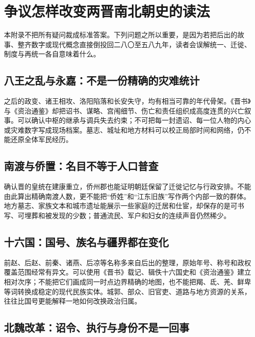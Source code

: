 \chapter{争议怎样改变两晋南北朝史的读法}
\label{app:controversies}

本附录不把所有疑问裁成标准答案。下列问题之所以重要，是因为若把后出的故事、整齐数字或现代概念直接倒投回二八〇至五八九年，读者会误解统一、迁徙、制度与再统一各自意味着什么。

\section{八王之乱与永嘉：不是一份精确的灾难统计}

之后的政变、诸王相攻、洛阳陷落和长安失守，均有相当可靠的年代骨架。《晋书》与《资治通鉴》却把诏书、谋略、宫闱细节、伤亡和责任组织成高度连贯的兴亡叙事。可以确认中枢的继承与调兵失去约束；不可把每一封遗诏、每一位人物的内心或灾难数字写成现场档案。墓志、城址和地方材料可以校正局部时间和网络，仍不能还原全体军民经历。

\section{南渡与侨置：名目不等于人口普查}

确认晋的皇统在建康重立，侨州郡也能证明朝廷保留了迁徙记忆与行政安排。不能由此算出精确南渡人数，更不能把“侨姓”和“江东旧族”写作两个内部一致的群体。地方墓志、家族文本和城市遗址能展示一些家庭的迁居和仕宦，却保存的是可书写、可埋葬和被发现的少数；普通流民、军户和妇女的连续声音仍然稀少。

\section{十六国：国号、族名与疆界都在变化}

前赵、后赵、前秦、诸燕、后凉等名称多来自后出的整理，原始年号、称号和政权覆盖范围经常有异文。可以使用《晋书》载记、辑佚十六国史和《资治通鉴》建立相对次序；不能把它们画成同一时点边界精确的地图，也不能把羯、氐、羌、鲜卑等词转换成稳定的现代民族实体。城郭、部众、旧官吏、道路与地方资源的关系，往往比国号更能解释一地如何改换政治归属。

\section{北魏改革：诏令、执行与身份不是一回事}


